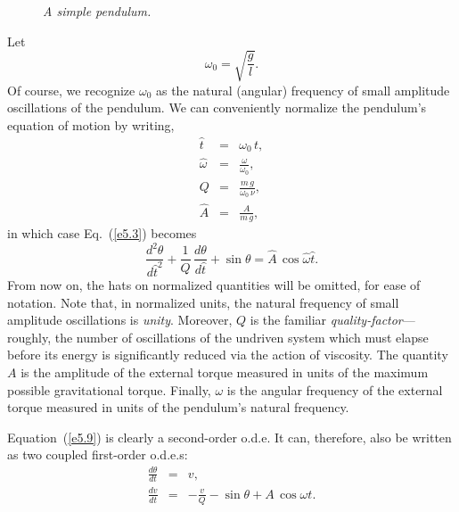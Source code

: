 \begin{figure}
\epsfysize=3in
\centerline{}
\caption{\em A simple pendulum.}\label{cf1}
\end{figure}


Let
\begin{equation}
\omega_0 = \sqrt{\frac{g}{l}}.
\end{equation}
Of course, we recognize $\omega_0$ as the natural (angular) frequency of small
amplitude oscillations of the pendulum. We can conveniently normalize the
pendulum's equation of motion by writing,
\begin{eqnarray}
\hat{t} &=& \omega_0\,t,\\[0.5ex]
\hat{\omega} &=& \frac{\omega}{\omega_0},\\[0.5ex]
Q &=& \frac{m\,g}{\omega_0\,\nu},\\[0.5ex]
\hat{A} &=& \frac{A}{m\,g},
\end{eqnarray}
in which case Eq.~(\ref{e5.3}) becomes
\begin{equation}\label{e5.9}
\frac{d^2\theta}{d\hat{t}^2} + \frac{1}{Q}\,\frac{d\theta}{d\hat{t}}
+ \sin\theta = \hat{A}\,\cos\hat{\omega}\hat{t}.
\end{equation}
From now on, the hats on normalized quantities will be omitted, for ease of
notation. Note that, in normalized units, the natural frequency of small amplitude
oscillations is {\em unity}. Moreover, $Q$ is the familiar {\em quality-factor}---roughly,
the number of oscillations of the undriven system which must
elapse before its energy is significantly
reduced via the action of viscosity. The quantity $A$ is the amplitude of the external
torque measured in units of the maximum possible gravitational torque. Finally,
$\omega$ is the angular frequency of the external torque measured in units of the
pendulum's natural frequency.

Equation~(\ref{e5.9}) is clearly a second-order o.d.e. It can, therefore, also be written as
two coupled first-order o.d.e.s:
\begin{eqnarray}
\frac{d\theta}{dt} &=& v,\label{e5.11}\\[0.5ex]
\frac{dv}{dt} &=& -\frac{v}{Q} -\sin\theta + A\,\cos\omega t.\label{e5.12}
\end{eqnarray}


